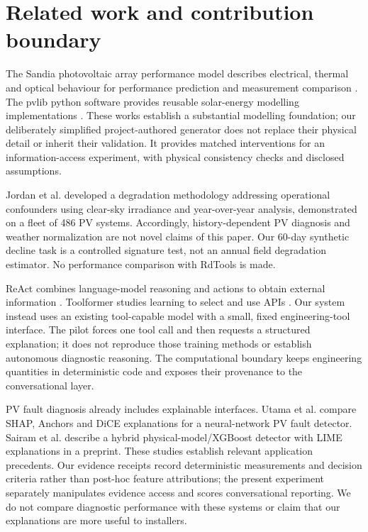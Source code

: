 \documentclass[11pt,a4paper]{article}
\begin{document}
\FloatBarrier
\section{Related work and contribution boundary}

The Sandia photovoltaic array performance model describes electrical, thermal and optical behaviour for performance prediction and measurement comparison \cite{king2004}. The pvlib python software provides reusable solar-energy modelling implementations \cite{holmgren2018}. These works establish a substantial modelling foundation; our deliberately simplified project-authored generator does not replace their physical detail or inherit their validation. It provides matched interventions for an information-access experiment, with physical consistency checks and disclosed assumptions.


Jordan et al. \cite{jordan2018} developed a degradation methodology addressing operational confounders using clear-sky irradiance and year-over-year analysis, demonstrated on a fleet of 486 PV systems. Accordingly, history-dependent PV diagnosis and weather normalization are not novel claims of this paper. Our 60-day synthetic decline task is a controlled signature test, not an annual field degradation estimator. No performance comparison with RdTools is made.


ReAct combines language-model reasoning and actions to obtain external information \cite{yao2023}. Toolformer studies learning to select and use APIs \cite{schick2023}. Our system instead uses an existing tool-capable model with a small, fixed engineering-tool interface. The pilot forces one tool call and then requests a structured explanation; it does not reproduce those training methods or establish autonomous diagnostic reasoning. The computational boundary keeps engineering quantities in deterministic code and exposes their provenance to the conversational layer.


PV fault diagnosis already includes explainable interfaces. Utama et al. \cite{utama2023} compare SHAP, Anchors and DiCE explanations for a neural-network PV fault detector. Sairam et al. \cite{sairam2020} describe a hybrid physical-model/XGBoost detector with LIME explanations in a preprint. These studies establish relevant application precedents. Our evidence receipts record deterministic measurements and decision criteria rather than post-hoc feature attributions; the present experiment separately manipulates evidence access and scores conversational reporting. We do not compare diagnostic performance with these systems or claim that our explanations are more useful to installers.
\end{document}

